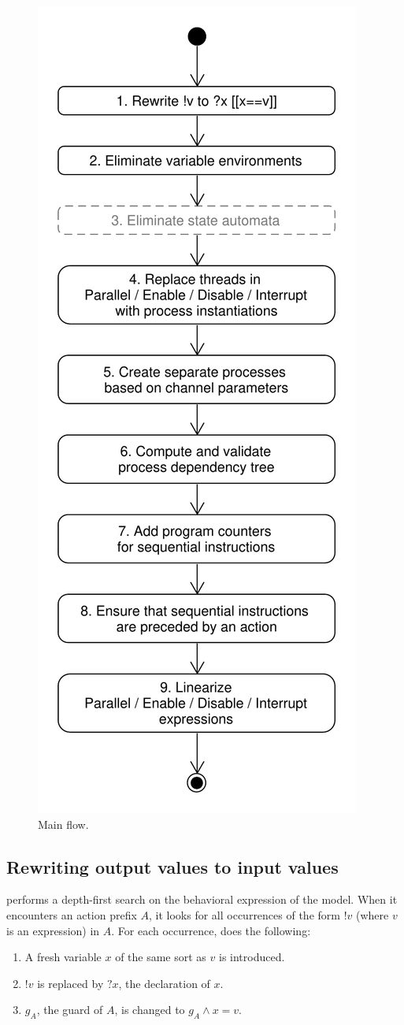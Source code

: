 \begin{figure}[!ht]
\begin{center}
\includegraphics[width=0.5\linewidth]{umlet/linearization-main-flow}
\caption{Main flow.}
\label{main-flow:fig}
\end{center}
\end{figure}

\begin{samepage}
\section{Rewriting output values to input values}

\lpeq{} performs a depth-first search on the behavioral expression of the model.
When it encounters an action prefix $A$, it looks for all occurrences of the form $\texttt{!}v$ (where $v$ is an expression) in $A$.
For each occurrence, \lpeq{} does the following:
\begin{enumerate}[1.]
\item A fresh variable $x$ of the same sort as $v$ is introduced.
\item $\texttt{!}v$ is replaced by $\texttt{?}x$, the declaration of $x$.
\item $g_A$, the guard of $A$, is changed to $g_A \land x = v$.
\end{enumerate}
\end{samepage}

